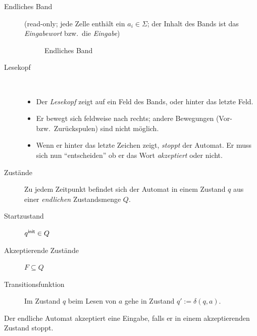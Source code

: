 \begin{description}
\item[Endliches Band] 
(read-only; jede Zelle enthält ein $a_i\in\Sigma$; der Inhalt des Bands ist das \emph{Eingabewort} bzw.\ die \emph{Eingabe})

\begin{figure}[H]\centering
        \caption{Endliches Band}
\end{figure}
\vspace{-1em}
\item[Lesekopf] ~\\
  \vspace{-\baselineskip}
  \begin{itemize}
        \item Der \emph{Lesekopf} zeigt auf ein Feld des Bands, oder hinter das letzte Feld.
        \item Er bewegt sich feldweise nach rechts; andere Bewegungen (Vor- bzw.\ Zurückspulen) sind nicht möglich.
        \item Wenn er hinter das letzte Zeichen zeigt, \emph{stoppt} der Automat.
    Er muss sich nun "`entscheiden"' ob er das Wort \emph{akzeptiert} oder nicht.
  \end{itemize}
\item[Zustände] Zu jedem Zeitpunkt befindet sich der Automat in einem Zustand $q$ aus einer \emph{endlichen} Zustandsmenge $Q$.
\item[Startzustand] $q^\mathsf{init} \in Q$
\item[Akzeptierende Zustände] $F \subseteq Q$ 
\item[Transitionsfunktion] Im Zustand $q$ beim Lesen von $a$ gehe in Zustand $q' := \delta(q,a)$.
\end{description}
Der endliche Automat akzeptiert eine Eingabe, falls er in einem akzeptierenden Zustand stoppt.

